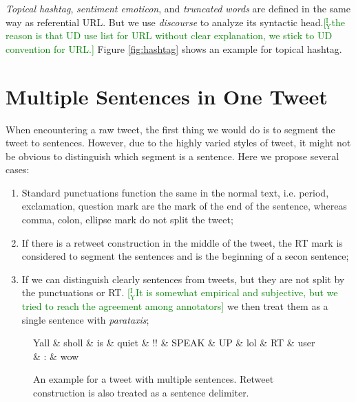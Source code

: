 \documentclass[11pt,a4paper]{article}
\newcommand{\yicomment}[1]{\textcolor{green}{[$_\mathrm{Y}^\mathrm{I}$#1]}}
\begin{document}
\textit{Topical hashtag}, \textit{sentiment emoticon}, and \textit{truncated words}
are defined in the same way as referential URL.
But we use \textit{discourse} to analyze its syntactic head.\yicomment{the reason is that UD use list for URL without clear explanation, we stick to UD convention for URL.}
Figure \ref{fig:hashtag} shows an example for topical hashtag.

\section{Multiple Sentences in One Tweet}\label{sec:sent-seg}
When encountering a raw tweet, 
the first thing we would do is to segment the tweet to sentences.
However, due to the highly varied styles of tweet, 
it might not be obvious to distinguish which segment is a sentence.
Here we propose several cases:
\begin{enumerate}
	\item Standard punctuations function the same in the normal text,
	i.e. period, exclamation, question mark are the mark of the end of the sentence,
	whereas comma, colon, ellipse mark do not split the tweet;
	\item If there is a retweet construction in the middle of the tweet,
	the RT mark is considered to segment the sentences and is the beginning of a secon sentence;
	\item If we can distinguish clearly sentences from tweets, 
	but they are not split by the punctuations or RT. \yicomment{It is somewhat empirical and subjective, but we tried to reach the agreement among annotators}
	we then treat them as a single sentence with \textit{parataxis};
\end{enumerate}

\begin{figure}[t]
	\centering
	\small
	\begin{dependency}[edge slant=2, text only label, label style=above]
		\begin{deptext}
			Yall \& sholl \& is \& quiet \& !! \& SPEAK \& UP \& lol \& RT \& user \& : \& wow \\
		\end{deptext}
	\end{dependency}
	\caption{An example for a tweet with multiple sentences. 
		Retweet  construction is also treated as a sentence delimiter.}\label{fig:multi-seg}
\end{figure}
\end{document}
